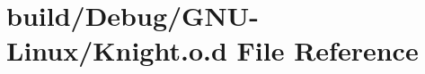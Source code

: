 \hypertarget{_g_n_u-_linux_2_knight_8o_8d}{}\section{build/\+Debug/\+G\+N\+U-\/\+Linux/\+Knight.o.\+d File Reference}
\label{_g_n_u-_linux_2_knight_8o_8d}
